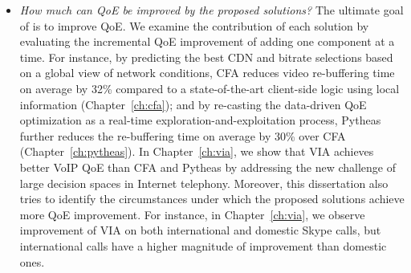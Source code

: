 \begin{itemize}

\item {\em How much can QoE be improved by the proposed solutions?}
The ultimate goal of \ddn is to improve QoE. 
We examine the 
contribution of each solution by evaluating the incremental QoE 
improvement of adding one component at a time. 
For instance, by predicting the best CDN and bitrate selections based on 
a global view of network conditions, CFA reduces video re-buffering time 
on average by 32\% compared to a state-of-the-art client-side logic using 
local information (Chapter~\ref{ch:cfa});
and by re-casting the data-driven QoE optimization as a real-time 
exploration-and-exploitation process, Pytheas further reduces the 
re-buffering time on average by 30\% over CFA (Chapter~\ref{ch:pytheas}).
In Chapter~\ref{ch:via}, we show that VIA achieves better VoIP QoE
than CFA and Pytheas
by addressing the new challenge of large decision spaces in
Internet telephony.
Moreover, this dissertation also tries to identify the circumstances under which
the proposed solutions achieve more QoE improvement.
For instance, in Chapter~\ref{ch:via}, we observe improvement of 
VIA on both international and domestic Skype calls, but international calls
have a higher magnitude of improvement than domestic ones.




\end{itemize}
